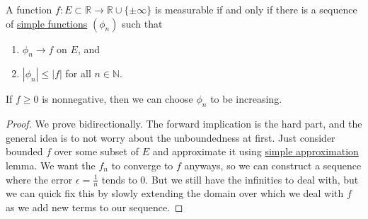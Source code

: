   \begin{theorem}
    \label{thm:simple-approximation-theorem}
    A function $f: E \subset \mathbb{R} \to \mathbb{R} \cup \{ \pm \infty\}$ is measurable if and only if there is a sequence of \hyperref[def:simple-functions]{simple functions} $(\phi_n)$ such that 
    \begin{enumerate}
      \item $\phi_n \to f$ on $E$, and 
      \item $|\phi_n| \leq |f|$ for all $n \in \mathbb{N}$. 
    \end{enumerate}
    If $f \geq 0$ is nonnegative, then we can choose $\phi_n$ to be increasing. 
  \end{theorem}
  \begin{proof}
    We prove bidirectionally. The forward implication is the hard part, and the general idea is to not worry about the unboundedness at first. Just consider bounded $f$ over some subset of $E$ and approximate it using \hyperref[thm:simple-approximation-theorem]{simple approximation} lemma. We want the $f_n$ to converge to $f$ anyways, so we can construct a sequence where the error $\epsilon = \frac{1}{n}$ tends to $0$. But we still have the infinities to deal with, but we can quick fix this by slowly extending the domain over which we deal with $f$ as we add new terms to our sequence. 


\end{proof}
